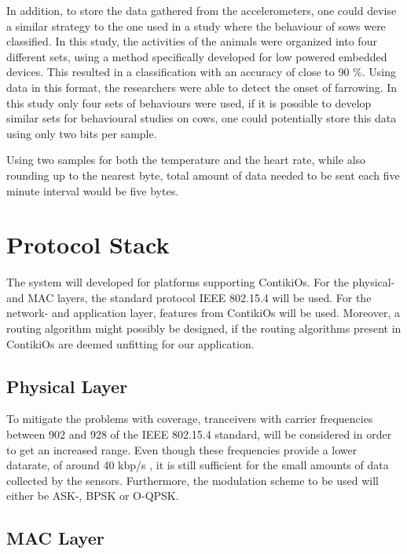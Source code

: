 \documentclass[conference]{IEEEtran}
\begin{document}
In addition, to store the data gathered from the accelerometers, one could
devise a similar strategy to the one used in a study where the behaviour of
sows were classified.\cite{marchioro_sows_2011} In this study, the activities
of the animals were organized into four different sets, using a method
specifically developed for low powered embedded devices. This resulted in
a classification with an accuracy of close to 90 \%. Using data in this format,
the researchers were able to detect the onset of farrowing. In this study only
four sets of behaviours were used, if it is possible to develop similar sets
for behavioural studies on cows, one could potentially store this data using
only two bits per sample.

Using two samples for both the temperature and the heart rate, while also
rounding up to the nearest byte, total amount of data needed to be sent each
five minute interval would be five bytes.


\section{Protocol Stack}

The system will developed for platforms supporting ContikiOs. For the
physical- and MAC layers, the standard protocol IEEE 802.15.4
\cite{ieee_computer_society_ieee_2011} will be used.  For the network- and
application layer, features from ContikiOs will be used.  Moreover, a routing
algorithm might possibly be designed, if the routing algorithms present in
ContikiOs are deemed unfitting for our application.

\subsection{Physical Layer}

To mitigate the problems with coverage, tranceivers with carrier frequencies
between 902 and 928 of the IEEE 802.15.4 standard, will be considered in order
to get an increased range. Even though these frequencies provide a lower
datarate, of around 40 kbp/s \cite{ieee_computer_society_ieee_2011}, it is
still sufficient for the small amounts of data collected by the sensors.
Furthermore, the modulation scheme to be used will either be ASK-, BPSK or
O-QPSK.

\subsection{MAC Layer}
\end{document}

